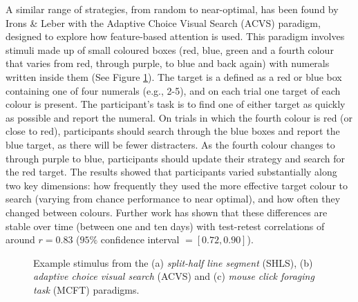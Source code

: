 \documentclass[twocolumn]{article}
\begin{document}
A similar range of strategies, from random to near-optimal, has been found by Irons \& Leber with the Adaptive Choice Visual Search (ACVS) paradigm\cite{irons-leber2016}, designed to explore how feature-based attention is used. This paradigm involves stimuli made up of small coloured boxes (red, blue, green and a fourth colour that varies from red, through purple, to blue and back again) with numerals written inside them (See Figure \ref{fig:exampleStimuli}). The target is a defined as a red or blue box containing one of four numerals (e.g., 2-5), and on each trial one target of each colour is present. The participant's task is to find one of either target as quickly as possible and report the numeral. On trials in which the fourth colour is red (or close to red), participants should search through the blue boxes and report the blue target, as there will be fewer distracters. As the fourth colour changes to through purple to blue, participants should update their strategy and search for the red target. The results showed that participants varied substantially along two key dimensions: how frequently they used the more effective target colour to search (varying from chance performance to near optimal), and how often they changed between colours. Further work\cite{irons-leber2018} has shown that these differences are stable over time (between one and ten days) with test-retest correlations of around $r = 0.83$ ($95\%$ confidence interval $= [0.72, 0.90]$).

\begin{figure}
\centering
{}
\caption{Example stimulus from the (a) \textit{split-half line segment} (SHLS), (b) \textit{adaptive choice visual search} (ACVS) and (c) \textit{mouse click foraging task} (MCFT) paradigms.}
\label{fig:exampleStimuli}
\end{figure}
\end{document}
